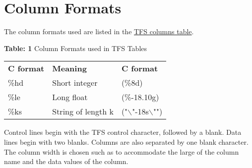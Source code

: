 
\section{Column Formats}

The column formats used are listed in the  \hyperlink{table}{TFS columns
  table}.  

\begin{center}
\begin{table}[H]
{\textbf{Table: 1} Column Formats used in TFS Tables}
\\
\begin{tabular}{l l l}
\textbf{C format} & \textbf{Meaning} & \textbf{C format} \\ 
\%hd & Short integer & (\%8d) \\ 
\%le & Long float & (\%-18.10g) \\ 
\%ks & String of length k & ("$\backslash$"-18s$\backslash$"")
\end{tabular}
\end{table}
\end{center}

Control lines begin with the TFS control character, followed by a
blank. Data lines begin with two blanks. Columns are also separated by
one blank character. The column width is chosen such as to accommodate
the large of the column name and the data values of the column.  


